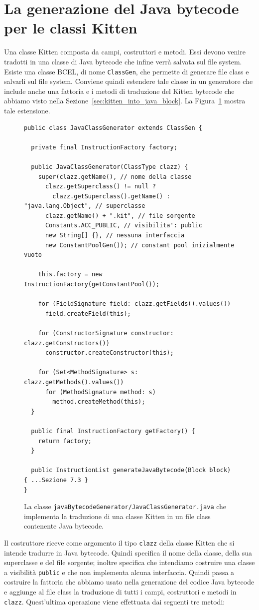 \section{La generazione del Java bytecode per le classi Kitten}
  \label{sec:kitten_signatures_into_java}
%
Una classe Kitten \e composta da campi, costruttori e metodi. Essi devono venire tradotti
in una classe di Java bytecode che infine verr\`a salvata sul file system. Esiste una
classe BCEL, di nome \texttt{ClassGen}, che permette di generare file class e
salvarli sul file system. Conviene quindi estendere tale classe in un generatore che include
anche una fattoria e i metodi di traduzione del Kitten bytecode che abbiamo visto
nella Sezione~\ref{sec:kitten_into_java_block}. La Figura~\ref{fig:java_class_generator}
mostra tale estensione.
%
\begin{figure}

{\small
\begin{verbatim}
public class JavaClassGenerator extends ClassGen {

  private final InstructionFactory factory;

  public JavaClassGenerator(ClassType clazz) {
    super(clazz.getName(), // nome della classe
      clazz.getSuperclass() != null ?
        clazz.getSuperclass().getName() : "java.lang.Object", // superclasse
      clazz.getName() + ".kit", // file sorgente
      Constants.ACC_PUBLIC, // visibilita': public
      new String[] {}, // nessuna interfaccia
      new ConstantPoolGen()); // constant pool inizialmente vuoto

    this.factory = new InstructionFactory(getConstantPool());

    for (FieldSignature field: clazz.getFields().values())
      field.createField(this);

    for (ConstructorSignature constructor: clazz.getConstructors())
      constructor.createConstructor(this);

    for (Set<MethodSignature> s: clazz.getMethods().values())
      for (MethodSignature method: s)
        method.createMethod(this);
  }

  public final InstructionFactory getFactory() {
    return factory;
  }

  public InstructionList generateJavaBytecode(Block block) { ...Sezione 7.3 }
}
\end{verbatim}}
\caption{La classe \texttt{javaBytecodeGenerator/JavaClassGenerator.java} che implementa la
traduzione di una classe Kitten in un file class contenente Java bytecode.}
  \label{fig:java_class_generator}
\end{figure}
%
Il costruttore riceve come argomento il tipo \texttt{clazz}
della classe Kitten che si intende
tradurre in Java bytecode. Quindi specifica
il nome della classe, della sua superclasse e del file sorgente;
inoltre specifica che intendiamo costruire una classe a visibilit\`a
\texttt{public} e che non implementa alcuna interfaccia. Quindi passa
a costruire la fattoria che abbiamo usato nella generazione del codice Java
bytecode e aggiunge al file class la traduzione di tutti i campi, costruttori
e metodi in \texttt{clazz}. Quest'ultima operazione viene effettuata dai
seguenti tre metodi:

